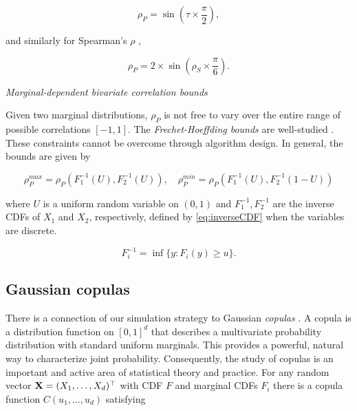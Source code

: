 \documentclass[
]{jss}
\begin{document}
\begin{equation}
\label{eq:convertKendall}
\rho_{P} = \sin \left( \tau \times \frac{\pi}{2} \right), 
\end{equation}

\noindent and similarly for Spearman's \(\rho\) \citep{K58},

\begin{equation}
\label{eq:convertSpearman}
\rho_P = 2 \times \sin \left( \rho_S \times \frac{\pi}{6} \right).
\end{equation}

\emph{Marginal-dependent bivariate correlation bounds}

Given two marginal distributions, \(\rho_P\) is not free to vary over the entire range of possible correlations \([-1,1]\). The \emph{Frechet-Hoeffding bounds} are well-studied \citep{Nelsen2007, BF17}. These constraints cannot be overcome through algorithm design. In general, the bounds are given by

\begin{equation}
\label{eq:frechet}
\rho_P^{max} = \rho_P \left( F^{-1}_1 (U), F^{-1}_2 (U) \right), \quad \rho_P^{min} = \rho_P \left( F^{-1}_1 (U), F^{-1}_2 (1 - U) \right)
\end{equation}

\noindent where \(U\) is a uniform random variable on \((0,1)\) and \(F^{-1}_1, F^{-1}_2\) are the inverse CDFs of \(X_1\) and \(X_2\), respectively, defined by \eqref{eq:inverseCDF} when the variables are discrete.

\begin{equation}
F_{i}^{-1} = \inf\{y:F_{i}(y) \geq u \}.
\label{eq:inverseCDF}
\end{equation}

\hypertarget{gaussian-copulas}{%
\subsection{Gaussian copulas}\label{gaussian-copulas}}

There is a connection of our simulation strategy to Gaussian \emph{copulas} \citep{Nelsen2007}. A copula is a distribution function on \([0,1]^d\) that describes a multivariate probability distribution with standard uniform marginals. This provides a powerful, natural way to characterize joint probability. Consequently, the study of copulas is an important and active area of statistical theory and practice. For any random vector \({\bf X}=(X_1, \ldots, X_d)^\top\) with CDF \(F\) and marginal CDFs \(F_i\) there is a copula function \(C(u_1, \ldots, u_d)\) satisfying
\end{document}
